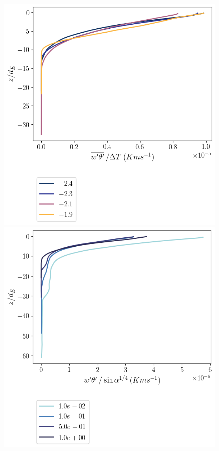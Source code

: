 \begin{figure}
    \centering
    \begin{minipage}{0.5\textwidth}
        \includegraphics[trim={0 4cm 0 0},clip,width=\textwidth]{Figures/heatflux_cmp_dT_43h_tav13_dTscale_z_profile.png}
    \end{minipage}%
    \begin{minipage}{0.5\textwidth}
        \includegraphics[trim={0 4cm 0 0},clip,width=\textwidth]{Figures/heatflux_cmp_slope_46h_tav13_slopescale_z_profile.png}

\end{minipage}
\end{figure}
